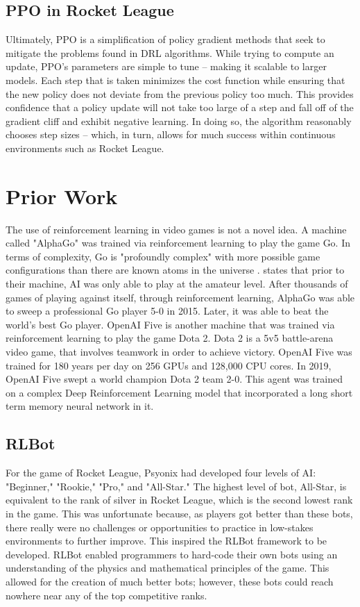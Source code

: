 \documentclass[10pt,twocolumn]{article}
\begin{document}
\subsection{PPO in Rocket League}
Ultimately, PPO is a simplification of policy gradient methods that seek to mitigate the problems found in DRL algorithms. While trying to compute an update, PPO’s parameters are simple to tune
– making it scalable to larger models. Each step that is taken minimizes the cost function while
ensuring that the new policy does not deviate from the previous policy too much. This provides
confidence that a policy update will not take too large of a step and fall off of the gradient cliff
and exhibit negative learning. In doing so, the algorithm reasonably chooses step sizes – which,
in turn, allows for much success within continuous environments such as Rocket League.

\section{Prior Work}
The use of reinforcement learning in video games is not a novel idea. A machine called "AlphaGo" was trained via reinforcement learning to play the game Go. In terms of complexity, Go is "profoundly complex" with more possible game configurations than there are known atoms in the universe \cite{deepmind}. \textcite{deepmind} states that prior to their machine, AI was only able to play at the amateur level. After thousands of games of playing against itself, through reinforcement learning, AlphaGo was able to sweep a professional Go player 5-0 in 2015. Later, it was able to beat the world's best Go player. OpenAI Five is another machine that was trained via reinforcement learning to play the game Dota 2\cite{OpenAI_dota}. Dota 2 is a 5v5 battle-arena video game, that involves teamwork in order to achieve victory. OpenAI Five was trained for 180 years per day on 256 GPUs and 128,000 CPU cores. In 2019, OpenAI Five swept a world champion Dota 2 team 2-0. This agent was trained on a complex Deep Reinforcement Learning model that incorporated a long short term memory neural network in it.
\subsection{RLBot}
For the game of Rocket League, Psyonix had developed four levels of AI: "Beginner," "Rookie," "Pro," and "All-Star." The highest level of bot, All-Star, is equivalent to the rank of silver in Rocket League, which is the second lowest rank in the game. This was unfortunate because, as players got better than these bots, there really were no challenges or opportunities to practice in low-stakes environments to further improve. This inspired the RLBot framework to be developed. RLBot enabled programmers to hard-code their own bots using an understanding of the physics and mathematical principles of the game. This allowed for the creation of much better bots; however, these bots could reach nowhere near any of the top competitive ranks.
\end{document}
